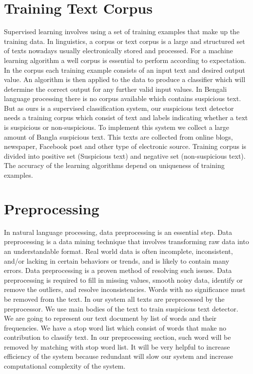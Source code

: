 \documentclass[12pt,a4paper]{report}
\begin{document}
 \section{Training Text Corpus}
 Supervised learning involves using a set of training examples that make up the training data. In linguistics, a corpus or text corpus is a large and structured set of texts nowadays usually electronically stored and processed. For a machine learning algorithm a well corpus is essential to perform according to expectation. In the corpus each training example consists of an input text and desired output value. An algorithm is then applied to the data to produce a classifier which will determine the correct output for any further valid input values. In Bengali language processing there is no corpus available which contains suspicious text. But as ours is a supervised classification system, our suspicious text detector needs a training corpus which consist of text and labels indicating whether a text is suspicious or non-suspicious. To implement this system we collect a large amount of Bangla  suspicious text. This texts are collected from online blogs, newspaper, Facebook post and other type of electronic source. Training corpus is divided into positive set (Suspicious text) and negative set (non-suspicious text). The accuracy of the learning algorithms depend on uniqueness of training examples.
 
 \section{Preprocessing}
 In natural language processing, data preprocessing is an essential step. Data preprocessing is a data mining technique that involves transforming raw data into an understandable format. Real world data is often incomplete, inconsistent, and/or lacking in certain behaviors or trends, and is likely to contain many errors. Data preprocessing is a proven method of resolving such issues. Data preprocessing is required to fill in missing values, smooth noisy data, identify or remove the outliers, and resolve inconsistencies.
 Words with no significance must be removed from the text. In our system all texts are preprocessed by the preprocessor. We use main bodies of the text to train suspicious text detector. We are going to represent our text document by list of words and their frequencies. We have a stop word list which consist of words that make no contribution to classify text. In our preprocessing section, such word will be removed by matching with stop word list. It will be very helpful to increase efficiency of the system because redundant will slow our system and increase computational complexity of the system.
 
\end{document}
